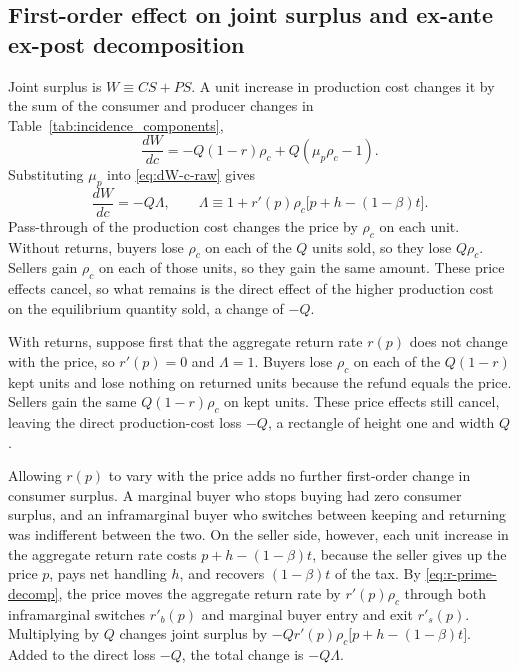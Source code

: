 \documentclass[11pt]{article}
\begin{document}
\subsection{First-order effect on joint surplus and ex-ante ex-post decomposition}
\label{sec:private-surplus}

Joint surplus is $W\equiv CS+PS$. A unit increase in production cost
changes it by the sum of the consumer and producer changes in
Table~\ref{tab:incidence_components},
\begin{equation}
  \frac{dW}{dc}
  =
  -Q(1-r)\rho_c+Q(\mu_p\rho_c-1).
  \label{eq:dW-c-raw}
\end{equation}
Substituting $\mu_p$
into \eqref{eq:dW-c-raw} gives
\begin{equation}
  \frac{dW}{dc}=-Q\Lambda,
  \qquad
  \Lambda\equiv 1+r'(p)\rho_c\bigl[p+h-(1-\beta)t\bigr].
  \label{eq:Lambda}
\end{equation}
Pass-through of the production cost changes the price by $\rho_c$ on each
unit. Without returns, buyers lose $\rho_c$ on each of the $Q$ units sold, so
they lose $Q\rho_c$. Sellers gain $\rho_c$ on each of those units, so they
gain the same amount. These price effects cancel, so what remains is the
direct effect of the higher production cost on the equilibrium quantity
sold, a change of $-Q$.

With returns, suppose first that the aggregate return rate $r(p)$ does not
change with the price, so $r'(p)=0$ and $\Lambda=1$. Buyers lose $\rho_c$ on
each of the $Q(1-r)$ kept units and lose nothing on returned units because
the refund equals the price. Sellers gain the same $Q(1-r)\rho_c$ on kept
units. These price effects still cancel, leaving the direct production-cost
loss $-Q$, a rectangle of height one and width $Q$.

Allowing $r(p)$ to vary with the price adds no further first-order change in
consumer surplus. A marginal buyer who stops buying had zero consumer surplus,
and an inframarginal buyer who switches between keeping and returning was
indifferent between the two. On the seller side, however, each unit increase
in the aggregate return rate costs $p+h-(1-\beta)t$, because the seller gives
up the price $p$, pays net handling $h$, and recovers $(1-\beta)t$ of the
tax. By \eqref{eq:r-prime-decomp}, the price moves the aggregate return rate
by $r'(p)\rho_c$ through both inframarginal switches $r'_b(p)$ and marginal
buyer entry and exit $r'_s(p)$. Multiplying by $Q$ changes joint surplus by
$-Qr'(p)\rho_c\bigl[p+h-(1-\beta)t\bigr]$. Added to the direct loss $-Q$, the
total change is $-Q\Lambda$.
\end{document}
